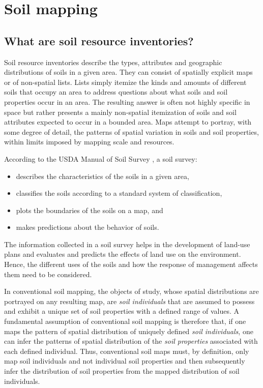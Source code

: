 \documentclass[graybox,natbib,nospthms,UStrade]{svmono}
\begin{document}
\hypertarget{soil-mapping}{%
\section{Soil mapping}\label{soil-mapping}}

\hypertarget{what-are-soil-resource-inventories}{%
\subsection{What are soil resource inventories?}\label{what-are-soil-resource-inventories}}

Soil resource inventories describe the types, attributes and geographic
distributions of soils in a given area. They can consist of spatially
explicit maps or of non-spatial lists. Lists simply itemize the kinds
and amounts of different soils that occupy an area to address questions
about what soils and soil properties occur in an area. The resulting
answer is often not highly specific in space but rather presents a
mainly non-spatial itemization of soils and soil attributes expected to
occur in a bounded area. Maps attempt to portray, with some degree of
detail, the patterns of spatial variation in soils and soil properties,
within limits imposed by mapping scale and resources.

According to the USDA Manual of Soil Survey \citep{SSDS1993}, a soil survey:

\begin{itemize}
\item
  describes the characteristics of the soils in a given area,
\item
  classifies the soils according to a standard system of
  classification,
\item
  plots the boundaries of the soils on a map, and
\item
  makes predictions about the behavior of soils.
\end{itemize}

The information collected in a soil survey helps in the development of
land-use plans and evaluates and predicts the effects of land use on the
environment. Hence, the different uses of the soils and how the response
of management affects them need to be considered.

In conventional soil mapping, the objects of study, whose spatial
distributions are portrayed on any resulting map, are \emph{soil individuals}
that are assumed to possess and exhibit a unique set of soil properties
with a defined range of values. A fundamental assumption of conventional
soil mapping is therefore that, if one maps the pattern of spatial
distribution of uniquely defined \emph{soil individuals}, one can infer the
patterns of spatial distribution of the \emph{soil properties} associated
with each defined individual. Thus, conventional soil maps must, by
definition, only map soil individuals and not individual soil properties
\citep{SSDS1993} and then subsequently infer the distribution of soil
properties from the mapped distribution of soil individuals.
\end{document}
